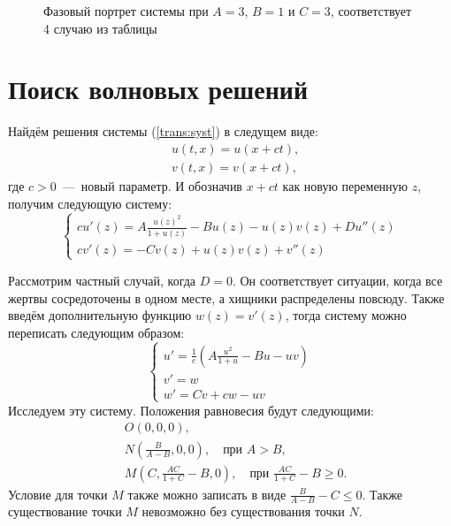 \documentclass{article}
\begin{document}
 \begin{figure}[h!]
\begin{center}
\caption{Фазовый портрет системы при $A=3$, $B=1$ и $C = 3$, соответствует 4 случаю из таблицы}
\label{fig_4}
\end{center}
\end{figure}

\clearpage

\section{Поиск волновых решений}

Найдём решения системы (\ref{trans:syst}) в следущем виде:
\begin{equation*}
\begin{aligned}
&u(t, x) = u(x + ct),\\
&v(t, x) = v(x + ct),
\end{aligned}
\end{equation*}
где $c > 0$~---~новый параметр. И обозначив $x + ct$ как новую переменную $z$, получим следующую систему:
\begin{equation*}
\begin{cases}
 c u'(z) = A\frac{u(z)^2}{1 + u(z)} - Bu(z) - u(z)v(z) + D u''(z)\\
c v'(z) = - Cv(z) + u(z)v(z) + v''(z)
\end{cases}
\end{equation*}

Рассмотрим частный случай, когда $D=0$. Он соответствует ситуации, когда все жертвы сосредоточены в одном месте, а хищники распределены повсюду. Также введём дополнительную  функцию $w(z) = v'(z)$, тогда систему можно переписать следующим образом:
\begin{equation}
\begin{cases}\label{dist:syst}
 u' = \frac{1}{c} \left( A\frac{u^2}{1 + u} - Bu - uv \right) \\
v' = w \\
w' = C v + cw - uv
\end{cases}
\end{equation}
Исследуем эту систему. Положения равновесия будут следующими:
\begin{equation*}
\begin{aligned}
&O(0, 0, 0),\\
&N\left(\frac{B}{A-B}, 0, 0\right), \quad \text{при } A>B,\\
&M \left(C, \frac{AC}{1 + C} - B, 0\right), \quad \text{при } \frac{AC}{1 + C} - B \geq 0.
\end{aligned}
\end{equation*}
Условие для точки $M$ также можно записать в виде $\frac{B}{A - B} - C \leq 0$. Также существование точки $M$ невозможно без существования точки $N$.
\end{document}
